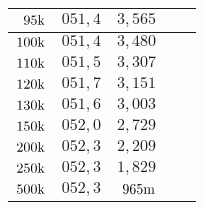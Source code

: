 \begin{table}[H]
\begin{tabular}{r||r|r||r|r|}
\multicolumn{1}{|r||}{$95\text{k}$}                      &$ 051,4     $&$ 3,565       $&$             $&$              $\\ \hline
\multicolumn{1}{|r||}{$100\text{k}$}                     &$ 051,4     $&$ 3,480       $&$             $&$              $\\ \hline
\multicolumn{1}{|r||}{$110\text{k}$}                     &$ 051,5     $&$ 3,307       $&$             $&$              $\\ \hline
\multicolumn{1}{|r||}{$120\text{k}$}                     &$ 051,7     $&$ 3,151       $&$             $&$              $\\ \hline
\multicolumn{1}{|r||}{$130\text{k}$}                     &$ 051,6     $&$ 3,003       $&$             $&$              $\\ \hline
\multicolumn{1}{|r||}{$150\text{k}$}                     &$ 052,0     $&$ 2,729       $&$             $&$              $\\ \hline
\multicolumn{1}{|r||}{$200\text{k}$}                     &$ 052,3     $&$ 2,209       $&$             $&$              $\\ \hline
\multicolumn{1}{|r||}{$250\text{k}$}                     &$ 052,3     $&$ 1,829       $&$             $&$              $\\ \hline
\multicolumn{1}{|r||}{$500\text{k}$}                     &$ 052,3     $&$ 965\text{m}      $&$             $&$              $\\ \hline
\end{tabular}
\end{table}